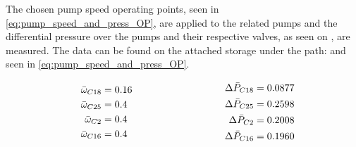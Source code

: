 
The chosen pump speed operating points, seen in \ref{eq:pump_speed_and_press_OP}, are applied to the related pumps and the differential pressure over the pumps and their respective valves, as seen on , are measured. 
The data can be found on the attached storage under the path:  and seen in \ref{eq:pump_speed_and_press_OP}.



\begin{equation}
\centering
  \begin{minipage}[b]{0.45\textwidth}
  \begin{equation*}
  	\begin{split}
    \bar{\omega}_{C18} &= 0.16\\
	\bar{\omega}_{C25} &= 0.4\\
	\bar{\omega}_{C2}  &= 0.4\\
	\bar{\omega}_{C16} &= 0.4
  	\end{split}
  \end{equation*}
  \end{minipage}
  \hfill
  \begin{minipage}[b]{0.45\textwidth}
  \begin{equation*}
  	\begin{split}
  	\Delta \bar{P}_{C18} &= 0.0877 \\
	\Delta \bar{P}_{C25} &= 0.2598 \\
	\Delta \bar{P}_{C2} &= 0.2008 \\
	\Delta \bar{P}_{C16} &=0.1960 
  	\end{split}
  \end{equation*}
  \end{minipage}
  \label{eq:pump_speed_and_press_OP}
\end{equation}

